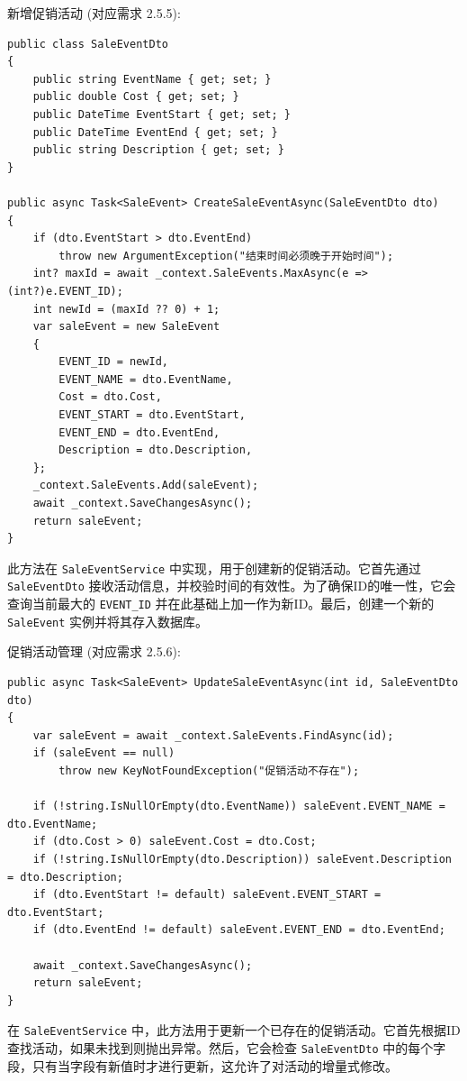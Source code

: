 \documentclass[]{article}
\begin{document}
新增促销活动 (对应需求 2.5.5):
\begin{verbatim}
public class SaleEventDto
{
    public string EventName { get; set; }
    public double Cost { get; set; }
    public DateTime EventStart { get; set; }
    public DateTime EventEnd { get; set; }
    public string Description { get; set; }
}

public async Task<SaleEvent> CreateSaleEventAsync(SaleEventDto dto)
{
    if (dto.EventStart > dto.EventEnd)
        throw new ArgumentException("结束时间必须晚于开始时间");
    int? maxId = await _context.SaleEvents.MaxAsync(e => (int?)e.EVENT_ID);
    int newId = (maxId ?? 0) + 1;
    var saleEvent = new SaleEvent
    {
        EVENT_ID = newId,
        EVENT_NAME = dto.EventName,
        Cost = dto.Cost,
        EVENT_START = dto.EventStart,
        EVENT_END = dto.EventEnd,
        Description = dto.Description,
    };
    _context.SaleEvents.Add(saleEvent);
    await _context.SaveChangesAsync();
    return saleEvent;
}
\end{verbatim}
此方法在 \texttt{SaleEventService} 中实现，用于创建新的促销活动。它首先通过 \texttt{SaleEventDto} 接收活动信息，并校验时间的有效性。为了确保ID的唯一性，它会查询当前最大的 \texttt{EVENT\_ID} 并在此基础上加一作为新ID。最后，创建一个新的 \texttt{SaleEvent} 实例并将其存入数据库。

促销活动管理 (对应需求 2.5.6):
\begin{verbatim}
public async Task<SaleEvent> UpdateSaleEventAsync(int id, SaleEventDto dto)
{
    var saleEvent = await _context.SaleEvents.FindAsync(id);
    if (saleEvent == null)
        throw new KeyNotFoundException("促销活动不存在");
    
    if (!string.IsNullOrEmpty(dto.EventName)) saleEvent.EVENT_NAME = dto.EventName;
    if (dto.Cost > 0) saleEvent.Cost = dto.Cost;
    if (!string.IsNullOrEmpty(dto.Description)) saleEvent.Description = dto.Description;
    if (dto.EventStart != default) saleEvent.EVENT_START = dto.EventStart;
    if (dto.EventEnd != default) saleEvent.EVENT_END = dto.EventEnd;

    await _context.SaveChangesAsync();
    return saleEvent;
}
\end{verbatim}
在 \texttt{SaleEventService} 中，此方法用于更新一个已存在的促销活动。它首先根据ID查找活动，如果未找到则抛出异常。然后，它会检查 \texttt{SaleEventDto} 中的每个字段，只有当字段有新值时才进行更新，这允许了对活动的增量式修改。
\end{document}
